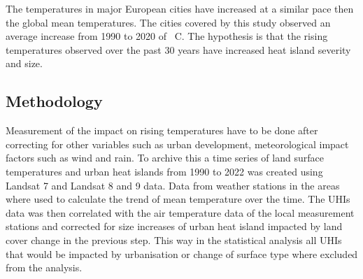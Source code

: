\documentclass[12pt,a4paper, english]{article}
\begin{document}
    The temperatures in major European cities have increased at a similar pace then the global mean temperatures. 
    The cities covered by this study observed an average increase from 1990 to 2020 of %
    \textdegree\ C. 
%
    The hypothesis is that the rising temperatures observed over the past 30 years have increased heat island severity and size. 
    \subsection{Methodology}
    Measurement of the impact on rising temperatures have to be done after correcting for other variables such as urban development, meteorological impact factors such as wind and rain. 
    To archive this a time series of land surface temperatures and urban heat islands from 1990 to 2022 was created using Landsat 7 and Landsat 8 and 9 data.
    Data from weather stations in the areas where used to calculate the trend of mean temperature over the time. 
    The \glspl{UHI} data was then correlated with the air temperature data of the local measurement stations and corrected for size increases of urban heat island impacted by land cover change in the previous step. 
    This way in the statistical analysis all \glspl{UHI} that would be impacted by urbanisation or change of surface type where excluded from the analysis.
%
%
\end{document}
